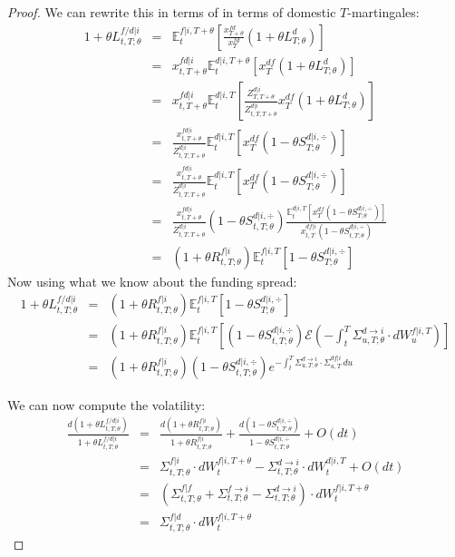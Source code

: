 \documentclass[11pt,english]{amsart}
\newcommand{\EE}{\mathbb{E}}
\theoremstyle{definition}
\begin{document}
\begin{proof}
We can rewrite this in terms of in terms of domestic $T$-martingales: 
\begin{eqnarray*}
   1 + \theta L^{f/d|i}_{t,T;\theta} 
   &=& \EE^{f|i,T+\theta}_t\left[ \frac{x^{fd}_{T+\theta}}{x^{fd}_{T}} (1+\theta L^{d}_{T;\theta}) \right] \\
   &=& x^{fd|i}_{t,T+\theta} \EE^{d|i,T+\theta}_t\left[ x^{df}_{T} (1+\theta L^{d}_{T;\theta}) \right]  \\
   &=& x^{fd|i}_{t,T+\theta} \EE^{d|i,T}_t\left[\frac{Z^{d|i}_{T,T+\theta}}{Z^{d|i}_{t,T,T+\theta}} x^{df}_{T} (1+\theta L^{d}_{T;\theta}) \right]  \\
   &=&  \frac{x^{fd|i}_{t,T+\theta}}{Z^{d|i}_{t,T,T+\theta}} \EE^{d|i,T}_t\left[ x^{df}_{T} (1-\theta S^{d|i,\div}_{T;\theta}) \right]  \\
   &=&   \frac{x^{fd|i}_{t,T+\theta}}{Z^{d|i}_{t,T,T+\theta}}  \EE^{d|i,T}_t\left[ x^{df}_{T} (1-\theta S^{d|i,\div}_{T;\theta}) \right]  \\
   &=&   \frac{x^{fd|i}_{t,T+\theta}}{Z^{d|i}_{t,T,T+\theta}}   (1-\theta S^{d|i,\div}_{t,T;\theta}) \frac{ \EE^{d|i,T}_t\left[ x^{df}_{T} (1-\theta S^{d|i,\div}_{T;\theta}) \right]  }  { x^{df|i}_{t,T} (1-\theta S^{d|i,\div}_{t,T;\theta})  }  \\
   &=&  (1+\theta R^{f|i}_{t,T;\theta})  \EE^{f|i,T}_t\left[ 1-\theta S^{d|i,\div}_{T;\theta} \right]  
\end{eqnarray*} 
Now using what we know about the funding spread:
\begin{eqnarray*}
   1 + \theta L^{f/d|i}_{t,T;\theta} 
   &=&  (1+\theta R^{f|i}_{t,T;\theta})  \EE^{f|i,T}_t\left[ 1-\theta S^{d|i,\div}_{T;\theta} \right]   \\
   &=& (1+\theta R^{f|i}_{t,T;\theta})  \EE^{f|i,T}_t\left[ (1-\theta S^{d|i,\div}_{t,T;\theta}) \mathcal{E}\left(- \int_t^T \Sigma^{d\to i}_{u,T;\theta} \cdot dW^{f|i,T}_u \right) \right]   \\
  &=& (1+\theta R^{f|i}_{t,T;\theta}) (1-\theta S^{d|i,\div}_{t,T;\theta}) e^{ - \int_t^T \Sigma^{d\to i}_{u,T;\theta} \cdot \Sigma^{df|i}_{u,T} \,du }  
\end{eqnarray*} 

We can now compute the volatility:
\begin{eqnarray*}
    \frac{d(1 + \theta L^{f/d|i}_{t,T;\theta})}{1 + \theta L^{f/d|i}_{t,T;\theta} } 
   &=& \frac{d(1 + \theta R^{f|i}_{t,T;\theta})}{1 + \theta R^{f|i}_{t,T;\theta}} 
   +  \frac{d(1-\theta S^{d|i,\div}_{t,T;\theta})}{1-\theta S^{d|i,\div}_{t,T;\theta}} + O(dt) \\
   &=& \Sigma^{f|i}_{t,T;\theta} \cdot dW^{f|i,T+\theta}_t  -  \Sigma^{d\to i}_{t,T;\theta} \cdot dW^{d|i,T}_t  + O(dt) \\
   &=& \left( \Sigma^{f|f}_{t,T;\theta} + \Sigma^{f\to i}_{t,T;\theta} -   \Sigma^{d\to i}_{t,T;\theta}\right) \cdot dW^{f|i,T+\theta}_t  \\
   &=&  \Sigma^{f|d}_{t,T;\theta} \cdot dW^{f|i,T+\theta}_t  
\end{eqnarray*} 

\end{proof}
\end{document}

